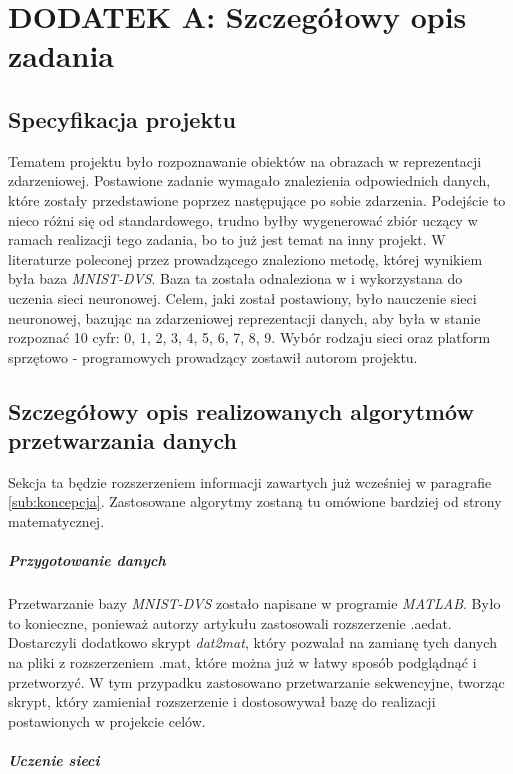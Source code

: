 \section{DODATEK A: Szczegółowy opis zadania}
\label{sub:dodatekA}

\subsection{Specyfikacja projektu}
\label{sub:specyfikacja}

Tematem projektu było rozpoznawanie obiektów na obrazach w reprezentacji zdarzeniowej. Postawione zadanie wymagało znalezienia odpowiednich danych, które zostały przedstawione poprzez następujące po sobie zdarzenia. Podejście to nieco różni się od standardowego, trudno byłby wygenerować zbiór uczący  w ramach realizacji tego zadania, bo to już jest temat na inny projekt. W literaturze poleconej przez prowadzącego znaleziono metodę, której wynikiem była baza \textit{MNIST-DVS}. Baza ta została odnaleziona w \cite{baza} i wykorzystana do uczenia sieci neuronowej. Celem, jaki został postawiony, było nauczenie sieci neuronowej, bazując na zdarzeniowej reprezentacji danych, aby była w stanie rozpoznać 10 cyfr: 0, 1, 2, 3, 4, 5, 6, 7, 8, 9. Wybór rodzaju sieci oraz platform sprzętowo - programowych prowadzący zostawił autorom projektu. 

\subsection{Szczegółowy opis realizowanych algorytmów przetwarzania danych}
\label{sub:opis}

Sekcja ta będzie rozszerzeniem informacji zawartych już wcześniej w paragrafie \ref{sub:koncepcja}. Zastosowane algorytmy zostaną tu omówione bardziej od strony matematycznej.

\subparagraph{Przygotowanie danych}
\label{sub:przyg}

Przetwarzanie bazy \textit{MNIST-DVS} zostało napisane w programie \textit{MATLAB}. Było to konieczne, ponieważ autorzy artykułu \cite{MNIST_DVS} zastosowali rozszerzenie .aedat. Dostarczyli dodatkowo skrypt \textit{dat2mat}, który pozwalał na zamianę tych danych na pliki z rozszerzeniem .mat, które można już w łatwy sposób podglądnąć i przetworzyć. W tym przypadku zastosowano przetwarzanie sekwencyjne, tworząc skrypt, który zamieniał rozszerzenie i dostosowywał bazę do realizacji postawionych w projekcie celów.

\subparagraph{Uczenie sieci}
\label{sub:ucz}

